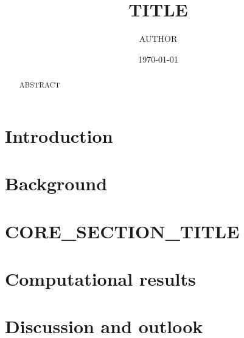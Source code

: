 \documentclass[10pt,a4paper]{amsart}
\theoremstyle{plain}
\theoremstyle{definition}
\theoremstyle{remark}
\begin{document}

\title{{{TITLE}}}
\author{{{AUTHOR}}}
\address{}
\date{\today}

\begin{abstract}
{{ABSTRACT}}
\end{abstract}

\maketitle
\tableofcontents

\section{Introduction}\label{sec:intro}



\section{Background}\label{sec:background}



\section{{{CORE_SECTION_TITLE}}}\label{sec:core}



\section{Computational results}\label{sec:computation}



\section{Discussion and outlook}\label{sec:outlook}






\end{document}

